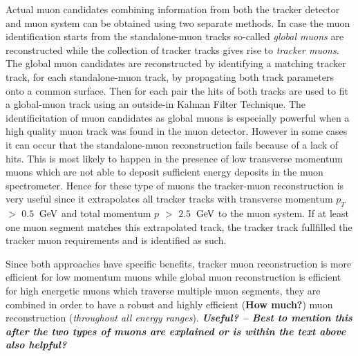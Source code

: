 Actual muon candidates combining information from both the tracker detector and muon system can be obtained using two separate methods. In case the muon identification starts from the standalone-muon tracks so-called \textit{global muons} are reconstructed while the collection of tracker tracks gives rise to \textit{tracker muons}.
The global muon candidates are reconstructed by identifying a matching tracker track, for each standalone-muon track, by propagating both track parameters onto a common surface. Then for each pair the hits of both tracks are used to fit a global-muon track using an outside-in Kalman Filter Technique. The identificitation of muon candidates as global muons is especially powerful when a high quality muon track was found in the muon detector. However in some cases it can occur that the standalone-muon reconstruction fails because of a lack of hits. This is most likely to happen in the presence of low transverse momentum muons which are not able to deposit sufficient energy deposits in the muon spectrometer. Hence for these type of muons the tracker-muon reconstruction is very useful since it extrapolates all tracker tracks with transverse momentum $p_T$ $>$ $0.5$ $\, \mathrm{GeV}$ and total momentum $p$ $>$ $2.5$ $\, \mathrm{GeV}$ to the muon system. If at least one muon segment matches this extrapolated track, the tracker track fullfilled the tracker muon requirements and is identified as such.

Since both approaches have specific benefits, tracker muon reconstruction is more efficient for low momentum muons while global muon reconstruction is efficient for high energetic muons which traverse multiple muon segments, they are combined in order to have a robust and highly efficient (\textbf{How much?}) muon reconstruction (\textit{throughout all energy ranges}). \textit{\textbf{Useful? -- Best to mention this after the two types of muons are explained or is within the text above also helpful?}}
\\

